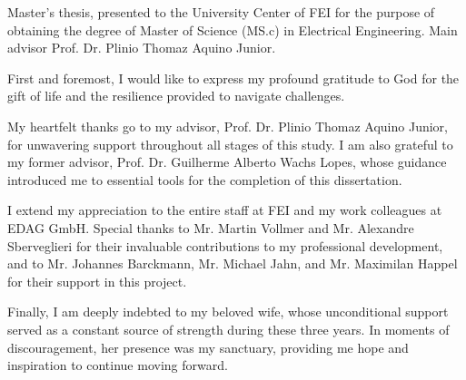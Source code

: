 \begin{folhaderosto}
Master's thesis, presented to the University Center of FEI for the purpose of obtaining the degree of Master of Science (MS.c) in Electrical Engineering. Main advisor Prof. Dr. Plinio Thomaz Aquino Junior.
\end{folhaderosto}

\fichacatalografica
\folhadeaprovacao

%


\begin{agradecimentos}
First and foremost, I would like to express my profound gratitude to God for the gift of life and the resilience provided to navigate challenges.

My heartfelt thanks go to my advisor, Prof. Dr. Plinio Thomaz Aquino Junior, for unwavering support throughout all stages of this study. I am also grateful to my former advisor, Prof. Dr. Guilherme Alberto Wachs Lopes, whose guidance introduced me to essential tools for the completion of this dissertation.

I extend my appreciation to the entire staff at FEI and my work colleagues at EDAG GmbH. Special thanks to Mr. Martin Vollmer and Mr. Alexandre Sberveglieri for their invaluable contributions to my professional development, and to Mr. Johannes Barckmann, Mr. Michael Jahn, and Mr. Maximilan Happel for their support in this project.

Finally, I am deeply indebted to my beloved wife, whose unconditional support served as a constant source of strength during these three years. In moments of discouragement, her presence was my sanctuary, providing me hope and inspiration to continue moving forward.
\end{agradecimentos}

\begin{epigrafe}
\end{epigrafe}